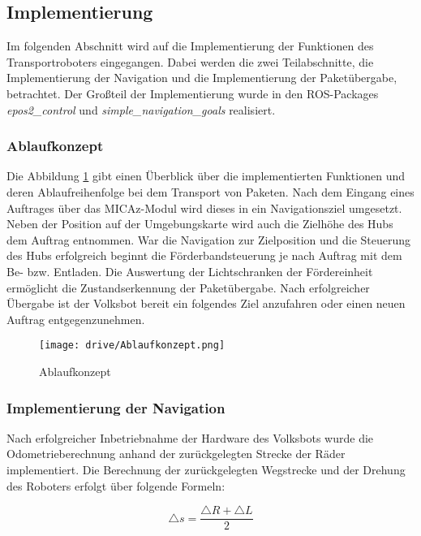 \subsection{Implementierung}

Im folgenden Abschnitt wird auf die Implementierung der Funktionen des Transportroboters eingegangen. Dabei werden die zwei Teilabschnitte, die Implementierung der Navigation und die Implementierung der Paketübergabe, betrachtet. Der Großteil der Implementierung wurde in den ROS-Packages \textit{epos2\_control} und \textit{simple\_navigation\_goals} realisiert.

\subsubsection{Ablaufkonzept}

Die Abbildung \ref{fig:Ablaufkonzept} gibt einen Überblick über die implementierten Funktionen und deren Ablaufreihenfolge bei dem Transport von Paketen. Nach dem Eingang eines Auftrages über das MICAz-Modul wird dieses in ein Navigationsziel umgesetzt. Neben der Position auf der Umgebungskarte wird auch die Zielhöhe des Hubs dem Auftrag entnommen. War die Navigation zur Zielposition und die Steuerung des Hubs erfolgreich beginnt die Förderbandsteuerung je nach Auftrag mit dem Be- bzw. Entladen. Die Auswertung der Lichtschranken der Fördereinheit ermöglicht die Zustandserkennung der Paketübergabe. Nach erfolgreicher Übergabe ist der Volksbot bereit ein folgendes Ziel anzufahren oder einen neuen Auftrag entgegenzunehmen.

\begin{figure}[h!]
 \centering
		\texttt{[image: drive/Ablaufkonzept.png]}
	\caption{Ablaufkonzept}
	\label{fig:Ablaufkonzept}
\end{figure}


\subsubsection{Implementierung der Navigation}
Nach erfolgreicher Inbetriebnahme der Hardware des Volksbots wurde die Odometrieberechnung anhand der zurückgelegten Strecke der Räder implementiert. Die Berechnung der zurückgelegten Wegstrecke und der Drehung des Roboters erfolgt über folgende Formeln\cite[S. 1]{Der:2000}:

\begin{equation}
\triangle s = \dfrac{\triangle R + \triangle L}{2}
\end{equation}
 
